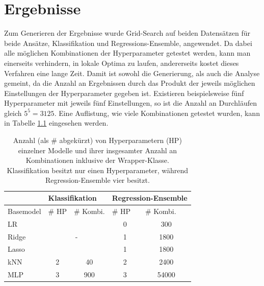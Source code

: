 \chapter{Ergebnisse}

Zum Generieren der Ergebnisse wurde Grid-Search auf beiden Datensätzen für beide Ansätze, Klassifikation und
 Regressions-Ensemble, angewendet. Da dabei alle möglichen Kombinationen der Hyperparameter getestet werden,
 kann man einerseits verhindern, in lokale Optima zu laufen, andererseits kostet dieses Verfahren eine lange
 Zeit. Damit ist sowohl die Generierung, als auch die Analyse gemeint, da die Anzahl an Ergebnissen durch das
 Produkt der jeweils möglichen Einstellungen der Hyperparameter gegeben ist. Existieren beispielsweise fünf
 Hyperparameter mit jeweils fünf Einstellungen, so ist die Anzahl an Durchläufen gleich $5^5=3125$.
 Eine Auflistung, wie viele Kombinationen getestet wurden, kann in Tabelle \ref{tab:res-kombs} eingesehen werden.

 \begin{table}[h]
    \centering
    \begin{tabular}{l|ll|ll}
    & \multicolumn{2}{l|}{Klassifikation} & \multicolumn{2}{l}{Regression-Ensemble} \\
    \hline
    Basemodel & \# HP & \# Kombi. & \# HP & \# Kombi. \\
    \hline
    LR        &                           &                                & \multicolumn{1}{c}{0}     & \multicolumn{1}{c}{300}       \\
    Ridge     &                           \multicolumn{2}{c|}{-}           & \multicolumn{1}{c}{1}     & \multicolumn{1}{c}{1800}      \\
    Lasso     &                           &                                & \multicolumn{1}{c}{1}     & \multicolumn{1}{c}{1800}      \\
    kNN       & \multicolumn{1}{c}{2}     & \multicolumn{1}{c|}{40}        & \multicolumn{1}{c}{2}     & \multicolumn{1}{c}{2400}      \\
    MLP       & \multicolumn{1}{c}{3}     & \multicolumn{1}{c|}{900}       & \multicolumn{1}{c}{3}     & \multicolumn{1}{c}{54000}
    \end{tabular}
    \caption{Anzahl (als \# abgekürzt) von Hyperparametern (HP) einzelner Modelle und ihrer insgesamter Anzahl an
        Kombinationen inklusive der Wrapper-Klasse. Klassifikation besitzt nur einen Hyperparameter, während
        Regression-Ensemble vier besitzt.}
    \label{tab:res-kombs}
\end{table}

